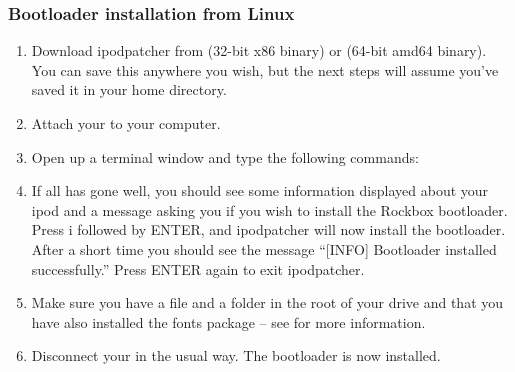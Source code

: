 \subsubsection{Bootloader installation from Linux}

\begin{enumerate} 

\item Download ipodpatcher from 
 (32-bit x86 
binary) or  
(64-bit amd64 binary). You can save this anywhere you wish, but the next 
steps will assume you've saved it in your home directory.

\item Attach your \dap{} to your computer.

\item Open up a terminal window and type the following commands:



\item If all has gone well, you should see some information displayed about
your ipod and a message asking you if you wish to install the Rockbox 
bootloader. Press i followed by ENTER, and ipodpatcher will now install the 
bootloader. After a short time you should see the message ``[INFO] Bootloader 
installed successfully.'' Press ENTER again to exit ipodpatcher.

\item Make sure you have a  file and a 
 folder in the 
root of your \daps{} drive and that you have also installed the fonts
package -- see  for more information.

\item Disconnect your \dap{} in the usual way. The bootloader is now installed. 

\end{enumerate} 
